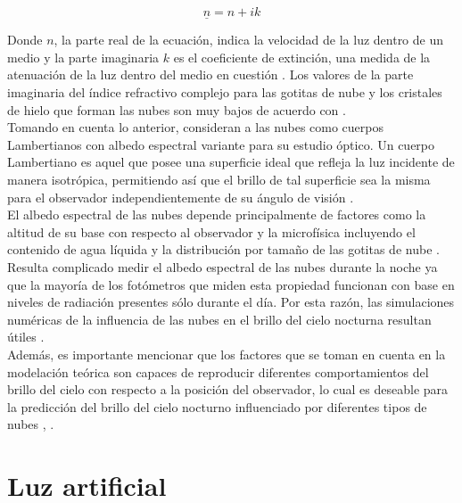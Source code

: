 \begin{equation}
\underline{n} = n + i k
\end{equation}

\vspace{2mm} 

Donde $n$, la parte real de la ecuación, indica la velocidad de la luz dentro de un medio y la parte imaginaria $k$ es el coeficiente de extinción, una medida de la atenuación de la luz dentro del medio en cuestión \citep{Born&Wolf2003}. Los valores de la parte imaginaria del índice refractivo complejo para las gotitas de nube y los cristales de hielo que forman las nubes son muy bajos de acuerdo con \cite{Solano2015}.\\

Tomando en cuenta lo anterior, \cite{Solano2015} consideran a las nubes como cuerpos Lambertianos con albedo espectral variante para su estudio óptico. Un cuerpo Lambertiano es aquel que posee una superficie ideal que refleja la luz incidente de manera isotrópica, permitiendo así que el brillo de tal superficie sea la misma para el observador independientemente de su ángulo de visión \citep{Born&Wolf2003}.\\

El albedo espectral de las nubes depende principalmente de factores como la altitud de su base con respecto al observador y la microfísica incluyendo el contenido de agua líquida y la distribución por tamaño de las gotitas de nube \citep{Kocifaj2007}.\\ 

Resulta complicado medir el albedo espectral de las nubes durante la noche ya que la mayoría de los fotómetros que miden esta propiedad funcionan con base en niveles de radiación presentes sólo durante el día. Por esta razón, las simulaciones numéricas de la influencia de las nubes en el brillo del cielo nocturna resultan útiles \citep{Solano2015}.\\

Además, es importante mencionar que los factores que se toman en cuenta en la modelación teórica son capaces de reproducir diferentes comportamientos del brillo del cielo con respecto a la posición del observador, lo cual es deseable para la predicción del brillo del cielo nocturno influenciado por diferentes tipos de nubes \citep{Kocifaj2007}, \citep{Solano2015}.

\newpage

\section{Luz artificial}\\
\label{sec:luzartificial}


